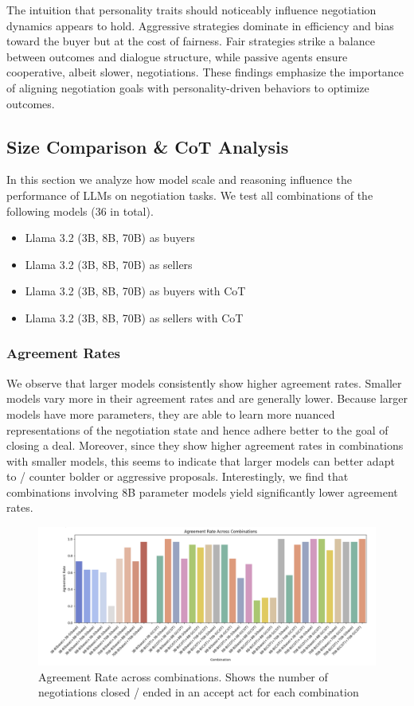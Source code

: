 \documentclass[11pt]{article}
\begin{document}
\noindent The intuition that personality traits should noticeably influence negotiation dynamics appears to hold. Aggressive strategies dominate in efficiency and bias toward the buyer but at the cost of fairness. Fair strategies strike a balance between outcomes and dialogue structure, while passive agents ensure cooperative, albeit slower, negotiations. These findings emphasize the importance of aligning negotiation goals with personality-driven behaviors to optimize outcomes.


\subsection{Size Comparison \& CoT Analysis}
In this section we analyze how model scale and reasoning influence the performance of LLMs on negotiation tasks. We test all combinations of the following models (36 in total). 
\begin{itemize}
    \item Llama 3.2 (3B, 8B, 70B) as buyers
    \item Llama 3.2 (3B, 8B, 70B) as sellers
    \item Llama 3.2 (3B, 8B, 70B) as buyers with CoT 
    \item Llama 3.2 (3B, 8B, 70B) as sellers with CoT
\end{itemize}

\subsubsection{Agreement Rates}
We observe that larger models consistently show higher agreement rates. Smaller models vary more in their agreement rates and are generally lower. Because larger models have more parameters, they are able to learn more nuanced representations of the negotiation state and hence adhere better to the goal of closing a deal. Moreover, since they show higher agreement rates in combinations with smaller models, this seems to indicate that larger models can better adapt to / counter bolder or aggressive proposals. Interestingly, we find that combinations involving 8B parameter models yield significantly lower agreement rates.  
\begin{figure}[h]
    \centering
    \includegraphics[width=1\linewidth]{figures/scale_cot/avg_agree.png}
    \caption{Agreement Rate across combinations. Shows the number of negotiations closed / ended in an accept act for each combination}
    \label{fig:agree}
\end{figure}
\end{document}
